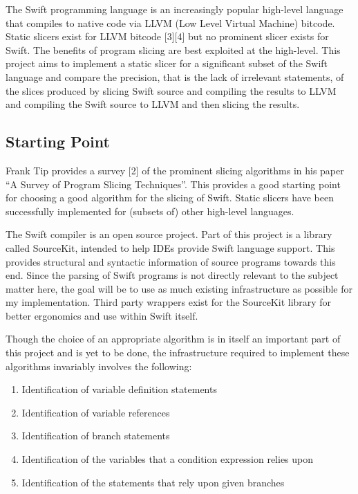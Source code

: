 The Swift programming language is an increasingly popular high-level
language that compiles to native code via LLVM (Low Level Virtual
Machine) bitcode. Static slicers exist for LLVM bitcode {[}3{]}{[}4{]}
but no prominent slicer exists for Swift. The benefits of program
slicing are best exploited at the high-level. This project aims to
implement a static slicer for a significant subset of the Swift language
and compare the precision, that is the lack of irrelevant statements, of
the slices produced by slicing Swift source and compiling the results to
LLVM and compiling the Swift source to LLVM and then slicing the
results.

\subsection{Starting Point}\label{starting-point}

Frank Tip provides a survey {[}2{]} of the prominent slicing algorithms
in his paper ``A Survey of Program Slicing Techniques''. This provides a
good starting point for choosing a good algorithm for the slicing of
Swift. Static slicers have been successfully implemented for (subsets
of) other high-level languages.

The Swift compiler is an open source project. Part of this project is a
library called SourceKit, intended to help IDEs provide Swift language
support. This provides structural and syntactic information of source
programs towards this end. Since the parsing of Swift programs is not
directly relevant to the subject matter here, the goal will be to use as
much existing infrastructure as possible for my implementation. Third
party wrappers exist for the SourceKit library for better ergonomics and
use within Swift itself.

Though the choice of an appropriate algorithm is in itself an important
part of this project and is yet to be done, the infrastructure required
to implement these algorithms invariably involves the following:

\begin{enumerate}
\def\labelenumi{\arabic{enumi}.}
\tightlist
\item
  Identification of variable definition statements
\item
  Identification of variable references
\item
  Identification of branch statements
\item
  Identification of the variables that a condition expression relies
  upon
\item
  Identification of the statements that rely upon given branches
\end{enumerate}

